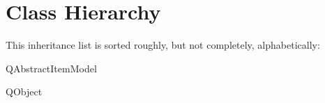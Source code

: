 \section{Class Hierarchy}
This inheritance list is sorted roughly, but not completely, alphabetically\+:\begin{DoxyCompactList}
\item {}
\item Q\+Abstract\+Item\+Model\begin{DoxyCompactList}
\item {}
\end{DoxyCompactList}
\item Q\+Object\begin{DoxyCompactList}
\item {}
\item {}
\item {}
\end{DoxyCompactList}
\end{DoxyCompactList}
